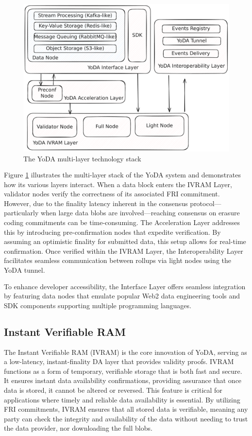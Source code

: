 \documentclass[11pt]{article}
\begin{document}
\begin{figure}[htp]
    \centering
    \includegraphics[scale=0.2]{yoda-arch.pdf}
    \caption{The YoDA multi-layer technology stack}
    \label{fig:yoda-arch}
\end{figure}

Figure \ref{fig:yoda-arch} illustrates the multi-layer stack of the YoDA system and demonstrates how its various layers interact. When a data block enters the IVRAM Layer, validator nodes verify the correctness of its associated FRI commitment. However, due to the finality latency inherent in the consensus protocol—particularly when large data blobs are involved—reaching consensus on erasure coding commitments can be time-consuming. The Acceleration Layer addresses this by introducing pre-confirmation nodes that expedite verification. By assuming an optimistic finality for submitted data, this setup allows for real-time confirmation. Once verified within the IVRAM Layer, the Interoperability Layer facilitates seamless communication between rollups via light nodes using the YoDA tunnel.

To enhance developer accessibility, the Interface Layer offers seamless integration by featuring data nodes that emulate popular Web2 data engineering tools and SDK components supporting multiple programming languages.

\subsection{Instant Verifiable RAM}
The Instant Verifiable RAM (IVRAM) is the core innovation of YoDA, serving as a low-latency, instant-finality DA layer that provides validity proofs. IVRAM functions as a form of temporary, verifiable storage that is both fast and secure. It ensures instant data availability confirmations, providing assurance that once data is stored, it cannot be altered or reversed. This feature is critical for applications where timely and reliable data availability is essential. By utilizing FRI commitments, IVRAM ensures that all stored data is verifiable, meaning any party can check the integrity and availability of the data without needing to trust the data provider, nor downloading the full blobs.
\end{document}
